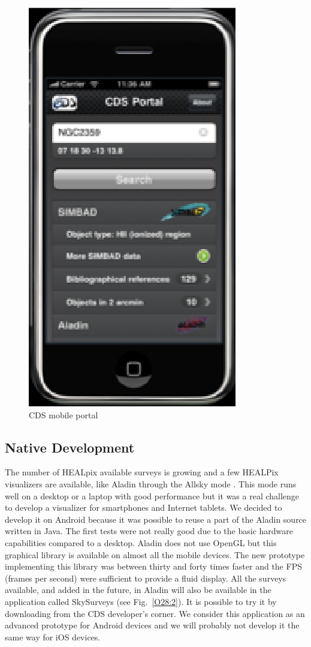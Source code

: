 \begin{figure}[h] \center
\includegraphics[scale=0.7]{part5/Schaaff_O28/O28_f4.eps}
\caption{CDS mobile portal} 
\label{O28:1}
\end{figure}

\subsection{Native Development}
The number of HEALpix \citep{gorski_2005} available surveys is growing and a few HEALPix visualizers are available, like Aladin through the Allsky mode \citep{fernique_2010}. This mode runs well on a desktop or a laptop with good performance but it was a real challenge to develop a visualizer for smartphones and Internet tablets. We decided to develop it on Android because it was possible to reuse a part of the Aladin source written in Java. The first tests were not really good due to the basic hardware capabilities compared to a desktop. Aladin does not use OpenGL but this graphical library is available on almost all the mobile devices. The new prototype implementing this library was between thirty and forty times faster and the FPS (frames per second) were sufficient to provide a fluid display.
All the surveys available, and added in the future, in Aladin will also be available in the application called SkySurveys (see Fig.~\ref{O28:2}). It is possible to try it by downloading from the CDS developer's corner. 
We consider this application as an advanced prototype for Android devices and we will probably not develop it the same way for iOS devices.


